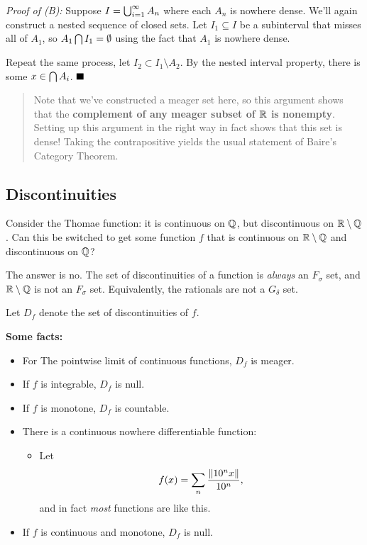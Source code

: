 \emph{Proof of (B):} Suppose \(I = \bigcup_{i=1}^\infty A_n\) where each
\(A_n\) is nowhere dense. We'll again construct a nested sequence of
closed sets. Let \(I_1 \subseteq I\) be a subinterval that misses all of
\(A_1\), so \(A_1 \bigcap I_1 = \emptyset\) using the fact that
\(A_1\) is nowhere dense.

Repeat the same process, let \(I_2 \subset I_1 \setminus A_2\). By the
nested interval property, there is some \(x\in \bigcap A_i\).
\(\qed\)

\begin{quote}
Note that we've constructed a meager set here, so this argument shows
that the \textbf{complement of any meager subset of \({\mathbb{R}}\) is
nonempty}. Setting up this argument in the right way in fact shows that
this set is dense! Taking the contrapositive yields the usual statement
of Baire's Category Theorem.
\end{quote}

\hypertarget{discontinuities}{%
\subsection{Discontinuities}\label{discontinuities}}

Consider the Thomae function: it is continuous on \({\mathbb{Q}}\), but
discontinuous on \({\mathbb{R}}\setminus{\mathbb{Q}}\). Can this be switched to get some
function \(f\) that is continuous on \({\mathbb{R}}\setminus {\mathbb{Q}}\) and
discontinuous on \({\mathbb{Q}}\)?

The answer is no. The set of discontinuities of a function is
\emph{always} an \(F_\sigma\) set, and \({\mathbb{R}}\setminus {\mathbb{Q}}\) is not an
\(F_\sigma\) set. Equivalently, the rationals are not a \(G_\delta\)
set.

Let \(D_f\) denote the set of discontinuities of \(f\).

\textbf{Some facts:}

\begin{itemize}
\item
  For The pointwise limit of continuous functions, \(D_f\) is meager.
\item
  If \(f\) is integrable, \(D_f\) is null.
\item
  If \(f\) is monotone, \(D_f\) is countable.
\item
  There is a continuous nowhere differentiable function:

  \begin{itemize}
  \tightlist
  \item
    Let
    \begin{align*}
    f(x) = \sum_n \frac{{\left\lVert {10^n x} \right\rVert}}{10^n},
    \end{align*} and in fact \emph{most} functions are like this.
  \end{itemize}
\item
  If \(f\) is continuous and monotone, \(D_f\) is null.
\end{itemize}

